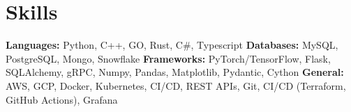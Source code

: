 \vspace{5 pt - 0.3 cm}
\section{Skills}
\begin{onecolentry}
    \textbf{Languages:} Python, C++, GO, Rust, C\#, Typescript \newline
    \textbf{Databases:} MySQL, PostgreSQL, Mongo, Snowflake \newline
    \textbf{Frameworks:} PyTorch/TensorFlow, Flask, SQLAlchemy, gRPC, Numpy, Pandas, Matplotlib, Pydantic, Cython   \newline
    \textbf{General:} AWS, GCP, Docker, Kubernetes, CI/CD, REST APIs, Git, CI/CD (Terraform, GitHub Actions), Grafana \newline
\end{onecolentry}